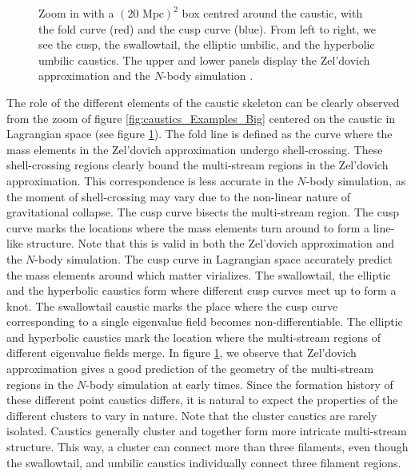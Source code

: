 \documentclass[a4paper, 11pt]{article}
\begin{document}
\begin{figure}
\begin{subfigure}[b]{0.24\textwidth}
\end{subfigure}
\caption{Zoom in with a $(20 \text{ Mpc})^2$ box centred around the caustic, with the fold curve (red) and the cusp curve (blue). From left to right, we see the cusp, the swallowtail, the elliptic umbilic, and the hyperbolic umbilic caustics. The upper and lower panels display the Zel'dovich approximation and the $N$-body simulation \cite{Hidding:2020}.}\label{fig:caustics_Examples_Small}
\end{figure}


The role of the different elements of the caustic skeleton can be clearly observed from the zoom of figure \ref{fig:caustics_Examples_Big} centered on the caustic in Lagrangian space (see figure \ref{fig:caustics_Examples_Small}). The fold line is defined as the curve where the mass elements in the Zel'dovich approximation undergo shell-crossing. These shell-crossing regions clearly bound the multi-stream regions in the Zel'dovich approximation. This correspondence is less accurate in the $N$-body simulation, as the moment of shell-crossing may vary due to the non-linear nature of gravitational collapse. The cusp curve bisects the multi-stream region. The cusp curve marks the locations where the mass elements turn around to form a line-like structure. Note that this is valid in both the Zel'dovich approximation and the $N$-body simulation. The cusp curve in Lagrangian space accurately predict the mass elements around which matter virializes. The swallowtail, the elliptic and the hyperbolic caustics form where different cusp curves meet up to form a knot. The swallowtail caustic marks the place where the cusp curve corresponding to a single eigenvalue field becomes non-differentiable. The elliptic and hyperbolic caustics mark the location where the multi-stream regions of different eigenvalue fields merge. In figure \ref{fig:caustics_Examples_Small}, we observe that Zel'dovich approximation gives a good prediction of the geometry of the multi-stream regions in the $N$-body simulation at early times. Since the formation history of these different point caustics differs, it is natural to expect the properties of the different clusters to vary in nature. Note that the cluster caustics are rarely isolated. Caustics generally cluster and together form more intricate multi-stream structure. This way, a cluster can connect more than three filaments, even though the swallowtail, and umbilic caustics individually connect three filament regions.
\end{document}
